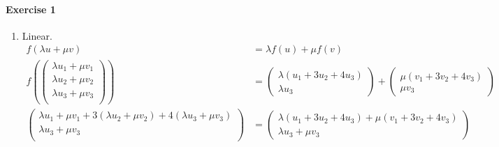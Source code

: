 \documentclass{article}
\begin{document}
\paragraph{Exercise 1}

\begin{enumerate}
    \item Linear.
    \begin{align*}
        f(\lambda u + \mu v) &= \lambda f(u) + \mu f(v) \\
        f\left(\begin{pmatrix}
            \lambda u_1 + \mu v_1 \\
            \lambda u_2 + \mu v_2 \\
            \lambda u_3 + \mu v_3 \\
        \end{pmatrix}\right) &= \begin{pmatrix}
            \lambda(u_1 + 3u_2 + 4u_3) \\
            \lambda u_3
        \end{pmatrix}
        +
        \begin{pmatrix}
            \mu(v_1 + 3v_2 + 4v_3) \\
            \mu v_3
        \end{pmatrix} \\
        \begin{pmatrix}
            \lambda u_1 + \mu v_1 + 3(\lambda u_2 + \mu v_2) + 4(\lambda u_3 + \mu v_3) \\
            \lambda u_3 + \mu v_3 \\
        \end{pmatrix} &= \begin{pmatrix}
            \lambda(u_1 + 3u_2 + 4u_3) + \mu(v_1 + 3v_2 + 4v_3) \\
            \lambda u_3 + \mu v_3
        \end{pmatrix}
    \end{align*}


\end{enumerate}
\end{document}
